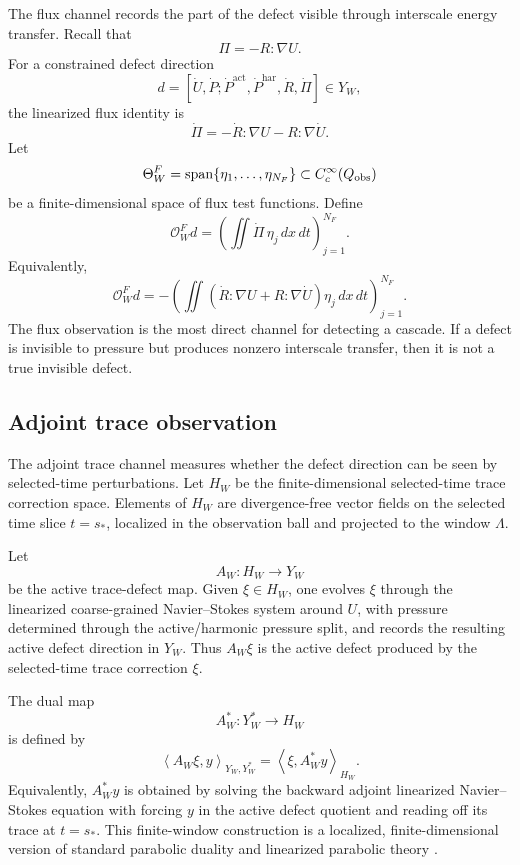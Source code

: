 \documentclass[11pt]{article}
\numberwithin{equation}{section}
\theoremstyle{plain}
\theoremstyle{definition}
\theoremstyle{remark}
\newcommand{\har}{\mathrm{har}}
\newcommand{\pair}[2]{\left\langle #1,#2\right\rangle}
\newcommand{\calO}{\mathcal O}
\newcommand{\act}{\mathrm{act}}
\begin{document}
The flux channel records the part of the defect visible through interscale energy transfer.  Recall that
\[
  \Pi=-R:\nabla U.
\]
For a constrained defect direction
\[
  d=[\dot U,\dot P;\dot P^{\act},\dot P^{\har},\dot R,\dot\Pi]\in Y_W,
\]
the linearized flux identity is
\begin{equation}
  \dot\Pi
  =
  -\dot R:\nabla U-R:\nabla\dot U.
  \label{eq:linearized-flux}
\end{equation}
Let
\[
  \Theta_W^F=\operatorname{span}\{\eta_1,\ldots,\eta_{N_F}\}
  \subset C_c^\infty(Q_{\rm obs})
\]
be a finite-dimensional space of flux test functions.  Define
\[
  \calO_W^F d
  =
  \left(
    \iint \dot\Pi\,\eta_j\,dx\,dt
  \right)_{j=1}^{N_F}.
\]
Equivalently,
\[
  \calO_W^F d
  =
  -\left(
  \iint
  \left(
    \dot R:\nabla U+R:\nabla\dot U
  \right)\eta_j\,dx\,dt
  \right)_{j=1}^{N_F}.
\]
The flux observation is the most direct channel for detecting a cascade.  If a defect is invisible to pressure but produces nonzero interscale transfer, then it is not a true invisible defect.

\subsection{Adjoint trace observation}

The adjoint trace channel measures whether the defect direction can be seen by selected-time perturbations.  Let \(H_W\) be the finite-dimensional selected-time trace correction space.  Elements of \(H_W\) are divergence-free vector fields on the selected time slice \(t=s_*\), localized in the observation ball and projected to the window \(\Lambda\).

Let
\[
  A_W:H_W\longrightarrow Y_W
\]
be the active trace-defect map.  Given \(\xi\in H_W\), one evolves \(\xi\) through the linearized coarse-grained Navier--Stokes system around \(U\), with pressure determined through the active/harmonic pressure split, and records the resulting active defect direction in \(Y_W\).  Thus \(A_W\xi\) is the active defect produced by the selected-time trace correction \(\xi\).

The dual map
\[
  A_W^*:Y_W^*\longrightarrow H_W
\]
is defined by
\[
  \pair{A_W\xi}{y}_{Y_W,Y_W^*}
  =
  \pair{\xi}{A_W^*y}_{H_W}.
\]
Equivalently, \(A_W^*y\) is obtained by solving the backward adjoint linearized Navier--Stokes equation with forcing \(y\) in the active defect quotient and reading off its trace at \(t=s_*\).  This finite-window construction is a localized, finite-dimensional version of standard parabolic duality and linearized parabolic theory \cite{Amann1995,Lunardi1995}.
\end{document}
